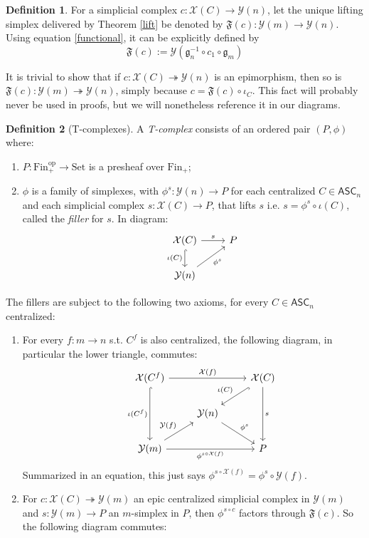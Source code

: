 \documentclass{article}
\theoremstyle{remark}
\theoremstyle{definition}
\newtheorem{definition}{Definition}[subsection]
\newcommand{\Fin}{\mathrm{Fin}}
\newcommand{\Set}{\mathrm{Set}}
\newcommand{\op}{\mathrm{op}}
\newcommand{\ASC}{\mathsf{ASC}}
\newcommand{\Y}{\mathcal Y}
\newcommand{\X}{\mathcal X}
\newcommand{\g}{\mathfrak g}
\newcommand{\F}{\mathfrak F}
\begin{document}
	\begin{definition}
		For a simplicial complex $c:\X(C)\to\Y(n)$, let the unique lifting simplex delivered by Theorem \ref{lift} be denoted by $\F(c):\Y(m)\to\Y(n)$. Using equation \ref{functional}, it can be explicitly defined by
		\[\F(c):=\Y(\g_n^{-1}\circ c_1\circ\g_m)\]
	\end{definition}
	It is trivial to show that if $c:\X(C)\twoheadrightarrow\Y(n)$ is an epimorphism, then so is $\F(c):\Y(m)\twoheadrightarrow\Y(n)$, simply because $c=\F(c)\circ\iota_C$. This fact will probably never be used in proofs, but we will nonetheless reference it in our diagrams.
	\begin{definition}[T-complexes]\label{TComp}
		A \textit{T-complex} consists of an ordered pair $(P,\phi)$ where:
		\begin{enumerate}
			\item $P:\Fin_+^\op\to\Set$ is a presheaf over $\Fin_+$;
			\item $\phi$ is a family of simplexes, with $\phi^s:\Y(n)\to P$ for each centralized $C\in\ASC_n$ and each simplicial complex $s:\X(C)\to P$, that lifts $s$ i.e. $s=\phi^s\circ\iota(C)$, called the \textit{filler} for $s$. In diagram:
			\[\begin{tikzcd}
				&\X(C)\arrow{r}{s}\arrow[hook]{d}[swap]{\iota(C)}&P\\
				&\Y(n)\arrow{ur}[swap]{\phi^s}
			\end{tikzcd}\]
		\end{enumerate}
		The fillers are subject to the following two axioms, for every $C\in\ASC_n$ centralized:
		\begin{enumerate}
			\item For every $f:m\to n$ s.t. $C^f$ is also centralized, the following diagram, in particular the lower triangle, commutes:
			\begin{equation}\label{pullbackcomp}\begin{tikzcd}
				&\X(C^f)\arrow[hook]{dd}[swap]{\iota(C^f)}\arrow{rr}{\X(f)}&&\X(C)\arrow[hook]{ld}[swap]{\iota(C)}\arrow{dd}{s}\\
				&&\Y(n)\arrow{dr}{\phi^s}\\
				&\Y(m)\arrow{ur}{\Y(f)}\arrow{rr}[swap]{\phi^{s\circ\X(f)}}&&P
			\end{tikzcd}\end{equation}
			Summarized in an equation, this just says $\phi^{s\circ\X(f)}=\phi^s\circ\Y(f)$.
			\item For $c:\X(C)\twoheadrightarrow\Y(m)$ an epic centralized simplicial complex in $\Y(m)$ and $s:\Y(m)\to P$ an $m$-simplex in $P$, then $\phi^{s\circ c}$ factors through $\F(c)$. So the following diagram commutes:

\end{enumerate}
\end{definition}
\end{document}
